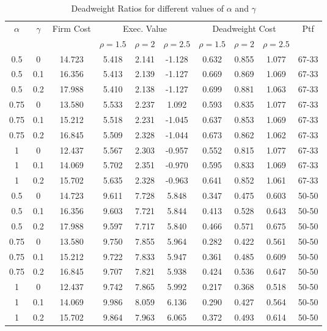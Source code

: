 \vspace*{10pt}

\begin{table}[H]
    \centering
    \begin{tabular}{cccccccccc}
        \hline
        \multirow{2}{*}{$\alpha$} & \multirow{2}{*}{$\gamma$} & \multirow{2}{*}{Firm Cost} & \multicolumn{3}{c}{Exec. Value} & \multicolumn{3}{c}{Deadweight Cost} & \multirow{2}{*}{Ptf}\\
        & & & $\rho = 1.5$ & $\rho = 2$ & $\rho = 2.5$ & $\rho = 1.5$ & $\rho = 2$ & $\rho = 2.5$ & \\
        \hline
        0.5 & 0 & 14.723 & 5.418 & 2.141 & -1.128 & 0.632 & 0.855 & 1.077 & 67-33 \\
        0.5 & 0.1 & 16.356 & 5.413 & 2.139 & -1.127 & 0.669 & 0.869 & 1.069 & 67-33 \\
        0.5 & 0.2 & 17.988 & 5.410 & 2.138 & -1.127 & 0.699 & 0.881 & 1.063 & 67-33 \\
        0.75 & 0 & 13.580 & 5.533 & 2.237 & 1.092 & 0.593 & 0.835 & 1.077 & 67-33 \\
        0.75 & 0.1 & 15.212 & 5.518 & 2.231 & -1.045 & 0.637 & 0.853 & 1.069 & 67-33 \\
        0.75 & 0.2 & 16.845 & 5.509 & 2.328 & -1.044 & 0.673 & 0.862 & 1.062 & 67-33 \\
        1 & 0 & 12.437 & 5.567 & 2.303 & -0.957 & 0.552 & 0.815 & 1.077 & 67-33 \\
        1 & 0.1 & 14.069 & 5.702 & 2.351 & -0.970 & 0.595 & 0.833 & 1.069 & 67-33 \\
        1 & 0.2 & 15.702 & 5.635 & 2.328 & -0.963 & 0.641 & 0.852 & 1.061 & 67-33 \\
        0.5 & 0 & 14.723 & 9.611 & 7.728 & 5.848 & 0.347 & 0.475 & 0.603 & 50-50 \\
        0.5 & 0.1 & 16.356 & 9.603 & 7.721 & 5.844 & 0.413 & 0.528 & 0.643 & 50-50 \\
        0.5 & 0.2 & 17.988 & 9.597 & 7.717 & 5.840 & 0.466 & 0.571 & 0.675 & 50-50 \\
        0.75 & 0 & 13.580 & 9.750 & 7.855 & 5.964 & 0.282 & 0.422 & 0.561 & 50-50 \\
        0.75 & 0.1 & 15.212 & 9.722 & 7.833 & 5.947 & 0.361 & 0.485 & 0.609 & 50-50 \\
        0.75 & 0.2 & 16.845 & 9.707 & 7.821 & 5.938 & 0.424 & 0.536 & 0.647 & 50-50 \\
        1 & 0 & 12.437 & 9.742 & 7.865 & 5.992 & 0.217 & 0.368 & 0.518 & 50-50 \\
        1 & 0.1 & 14.069 & 9.986 & 8.059 & 6.136 & 0.290 & 0.427 & 0.564 & 50-50 \\
        1 & 0.2 & 15.702 & 9.864 & 7.963 & 6.065 & 0.372 & 0.493 & 0.614 & 50-50 \\
        \hline
    
    \end{tabular}

    \caption{Deadweight Ratios for different values of $\alpha$ and $\gamma$}
    \label{tab:deadweight_ratio}
\end{table}

\vspace*{10pt}
    